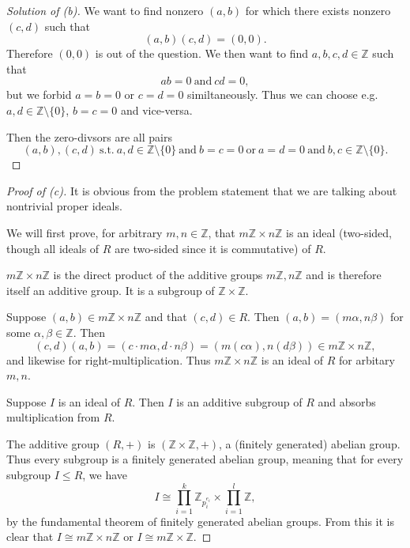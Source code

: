 \begin{proof}[Solution of (b)]
    We want to find nonzero 
    $(a,b)$ for which there exists 
    nonzero $(c,d)$ such that 
    \[
        (a,b)(c,d) = (0,0).
    \]
    Therefore $(0,0)$ is out of the question. 
    We then want to find $a,b,c,d \in \mathbb Z$ such 
    that 
    \[
        ab = 0 \ \text{and} \ cd = 0, 
    \]
    but we forbid $a = b = 0$ or $c = d = 0$ 
    similtaneously. 
    Thus we can choose e.g. $a, d \in \mathbb Z\setminus\{0\}$, 
    $b = c = 0$ and vice-versa. 

    Then the zero-divsors are all pairs 
    \[
        (a,b),(c,d) \ \text{s.t.} \ 
        a,d \in \mathbb Z \setminus \{0\} \ 
        \text{and} \ b = c = 0 \ \text{or} \ 
        a = d = 0 \ \text{and} \ 
        b,c \in \mathbb Z\setminus\{0\}.
    \]
\end{proof}
\begin{proof}[Proof of (c)]
    It is obvious from the problem statement that 
    we are talking about nontrivial proper ideals. 

    We will first prove, for arbitrary 
    $m,n \in \mathbb Z$, that 
    $m\mathbb Z \times n \mathbb Z$ is 
    an ideal (two-sided, though all ideals of 
    $R$ are two-sided since it is commutative) of 
    $R$. 

    $m\mathbb Z\times n\mathbb Z$ is the 
    direct product of the additive groups 
    $m\mathbb Z, n \mathbb Z$ and is therefore 
    itself an additive group. It is 
    a subgroup of $\mathbb Z \times \mathbb Z$. 

    Suppose $(a,b) \in m \mathbb Z \times n \mathbb Z$ 
    and that $(c,d) \in R$. Then $(a,b) = (m\alpha, n\beta)$ for 
    some $\alpha,\beta \in \mathbb Z$. 
    Then 
    \[
        (c,d)(a,b) = (c \cdot m \alpha,d \cdot n \beta) 
        = (m (c\alpha), n (d\beta)) \in m\mathbb Z \times n \mathbb Z, 
    \]
    and likewise for right-multiplication.
    Thus $m \mathbb Z \times n \mathbb Z$ is an ideal 
    of $R$ for arbitary $m,n$. 

    Suppose $I$ is an ideal of $R$. 
    Then $I$ is an additive subgroup of $R$ and 
    absorbs multiplication from $R$.

    The additive group $(R, +)$ is 
    $(\mathbb Z \times \mathbb Z, +)$, a (finitely generated) 
    abelian group. Thus every subgroup is a finitely generated 
    abelian group, meaning that for every subgroup $I \leq R$, we 
    have 
    \[
        I \cong \prod_{i=1}^k \mathbb Z_{p_i^{e_i}} \times 
        \prod_{i=1}^l \mathbb Z,
    \]
    by the fundamental theorem of finitely generated abelian 
    groups.
    From this it is clear that $I \cong m \mathbb Z \times n \mathbb Z$ 
    or $I \cong m \mathbb Z \times \mathbb Z$. 
\end{proof}
